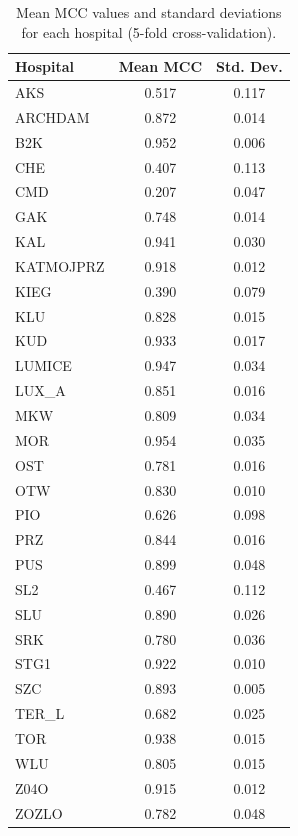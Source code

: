 \documentclass{bachelor2025eng}
\begin{document}
\begin{table}[ht]
    \centering
    \caption{Mean MCC values and standard deviations for each hospital (5-fold cross-validation).}
    \label{tab:mean_mcc_per_hospital}
    \begin{tabular}{|l|c|c|}
    \hline
    \textbf{Hospital} & \textbf{Mean MCC} & \textbf{Std. Dev.} \\
    \hline
    AKS          & 0.517 & 0.117 \\
    ARCHDAM      & 0.872 & 0.014 \\
    B2K          & 0.952 & 0.006 \\
    CHE          & 0.407 & 0.113 \\
    CMD          & 0.207 & 0.047 \\
    GAK          & 0.748 & 0.014 \\
    KAL          & 0.941 & 0.030 \\
    KATMOJPRZ    & 0.918 & 0.012 \\
    KIEG         & 0.390 & 0.079 \\
    KLU          & 0.828 & 0.015 \\
    KUD          & 0.933 & 0.017 \\
    LUMICE       & 0.947 & 0.034 \\
    LUX\_A       & 0.851 & 0.016 \\
    MKW          & 0.809 & 0.034 \\
    MOR          & 0.954 & 0.035 \\
    OST          & 0.781 & 0.016 \\
    OTW          & 0.830 & 0.010 \\
    PIO          & 0.626 & 0.098 \\
    PRZ          & 0.844 & 0.016 \\
    PUS          & 0.899 & 0.048 \\
    SL2          & 0.467 & 0.112 \\
    SLU          & 0.890 & 0.026 \\
    SRK          & 0.780 & 0.036 \\
    STG1         & 0.922 & 0.010 \\
    SZC          & 0.893 & 0.005 \\
    TER\_L       & 0.682 & 0.025 \\
    TOR          & 0.938 & 0.015 \\
    WLU          & 0.805 & 0.015 \\
    Z04O         & 0.915 & 0.012 \\
    ZOZLO        & 0.782 & 0.048 \\
    \hline
    \end{tabular}
\end{table}

\end{document}

